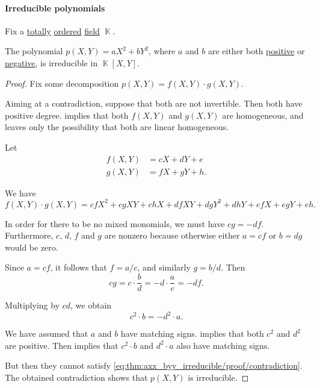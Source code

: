 \paragraph{Irreducible polynomials}

\begin{proposition}\label{thm:axx_byy_irreducible}
  Fix a \hyperref[def:totally_ordered_set]{totally} \hyperref[def:ordered_ring]{ordered} \hyperref[def:field]{field} \( \BbbK \).

  The polynomial \( p(X, Y) = a X^2 + b Y^2 \), where \( a \) and \( b \) are either both \hyperref[def:ordered_semiring_positivity]{positive} or \hyperref[def:ordered_semiring_positivity]{negative}, is irreducible in \( \BbbK[X, Y] \).
\end{proposition}
\begin{proof}
  Fix some decomposition \( p(X, Y) = f(X, Y) \cdot g(X, Y) \).

  Aiming at a contradiction, suppose that both are not invertible. Then both have positive degree.  implies that both \( f(X, Y) \) and \( g(X, Y) \) are homogeneous, and  leaves only the possibility that both are linear homogeneous.

  Let
  \begin{align*}
    f(X, Y) &= c X + d Y + e \\
    g(X, Y) &= f X + g Y + h.
  \end{align*}

  We have
  \begin{equation*}
    f(X, Y) \cdot g(X, Y) = c f X^2 + c g X Y + c h X + d f X Y + d g Y^2 + d h Y + e f X + e g Y + e h.
  \end{equation*}

  In order for there to be no mixed monomials, we must have \( c g = - d f \). Furthermore, \( c \), \( d \), \( f \) and \( g \) are nonzero because otherwise either \( a = c f \) or \( b = d g \) would be zero.

  Since \( a = c f \), it follows that \( f = a / c \), and similarly \( g = b / d \). Then
  \begin{equation*}
    c g = c \cdot \frac b d = - d \cdot \frac a c = - d f.
  \end{equation*}

  Multiplying by \( cd \), we obtain
  \begin{equation}\label{eq:thm:axx_byy_irreducible/proof/contradiction}
    c^2 \cdot b = - d^2 \cdot a.
  \end{equation}

  We have assumed that \( a \) and \( b \) have matching signs.  implies that both \( c^2 \) and \( d^2 \) are positive. Then  implies that \( c^2 \cdot b \) and \( d^2 \cdot a \) also have matching signs.

  But then they cannot satisfy \eqref{eq:thm:axx_byy_irreducible/proof/contradiction}. The obtained contradiction shows that \( p(X, Y) \) is irreducible.
\end{proof}

